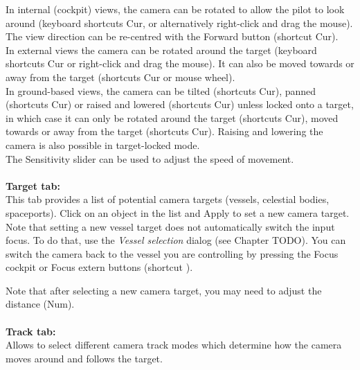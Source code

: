 \documentclass[Orbiter User Manual.tex]{subfiles}
\begin{document}
\noindent
In internal (cockpit) views, the camera can be rotated to allow the pilot to look around (keyboard shortcuts \Alt\DArrow\UArrow\RArrow\LArrow Cur, or alternatively right-click and drag the mouse). The view direction can be re-centred with the Forward button (shortcut \Home Cur).\\
In external views the camera can be rotated around the target (keyboard shortcuts \Ctrl\DArrow\UArrow\RArrow\LArrow Cur or right-click and drag the mouse). It can also be moved towards or away from the target (shortcuts Cur or mouse wheel).\\
In ground-based views, the camera can be tilted (shortcuts \DArrow\UArrow\RArrow\LArrow Cur), panned (shortcuts \Ctrl\DArrow\UArrow\RArrow\LArrow Cur) or raised and lowered (shortcuts  Cur) unless locked onto a target, in which case it can only be rotated around the target (shortcuts \Ctrl\RArrow\LArrow Cur), moved towards or away from the target (shortcuts \Ctrl\DArrow\UArrow Cur). Raising and lowering the camera is also possible in target-locked mode.\\
The Sensitivity slider can be used to adjust the speed of movement.\\
\\
\textbf{Target tab:}\\
This tab provides a list of potential camera targets (vessels, celestial bodies, spaceports). Click on an object in the list and Apply to set a new camera target. Note that setting a new vessel target does not automatically switch the input focus. To do that, use the \textit{Vessel selection} dialog (see Chapter TODO). You can switch the camera back to the vessel you are controlling by pressing the Focus cockpit or Focus extern buttons (shortcut ).\\

\begin{figure}[H]
	\centering
\end{figure}

\noindent
Note that after selecting a new camera target, you may need to adjust the distance (Num).\\
\\
\textbf{Track tab:}\\
Allows to select different camera track modes which determine how the camera moves around and follows the target.\\
\end{document}
